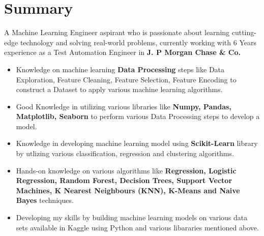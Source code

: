 \documentclass[letterpaper]{twentysecondcv} %
\begin{document}
\makeprofile %


\section{Summary}

A Machine Learning Engineer aspirant who is passionate about learning cutting-edge technology and solving real-world problems, currently working with 6 Years experience as a Test Automation Engineer in \textbf{J. P Morgan Chase \& Co.} \\
\begin{twenty}
\twentyitem
{}
{}
{}
{\href{}{}}
{}
{\begin{itemize}
\item Knowledge on machine learning \textbf{Data Processing} steps like Data Exploration, Feature Cleaning, Feature Selection, Feature Encoding to construct a Dataset to apply various machine learning algorithms.
\item Good Knowledge in utilizing various libraries like \textbf{Numpy, Pandas, Matplotlib, Seaborn} to perform various Data Processing steps to develop a model.
\item Knowledge in developing machine learning model using \textbf{Scikit-Learn} library by utlizing various classification, regression and clustering algorithms.
\item Hands-on knowledge on various algorithms like \textbf{Regression, Logistic Regression, Random Forest, Decision Trees, Support Vector Machines, K Nearest Neighbours (KNN), K-Means and Naive Bayes} techniques.
\item Developing my skills by building machine learning models on various data sets available in Kaggle using Python and various libararies mentioned above. 
\end{itemize}}
\\
\end{twenty}

\end{document}
